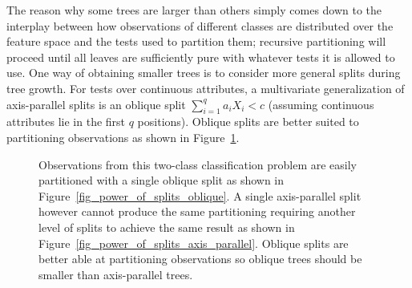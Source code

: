 The reason why some trees are larger than others simply comes down to the interplay between how observations of different classes are distributed over the feature space and the tests used to partition them; recursive partitioning will proceed until all leaves are sufficiently pure with whatever tests it is allowed to use. One way of obtaining smaller trees is to consider more general splits during tree growth. For tests over continuous attributes, a multivariate generalization of axis-parallel splits is an oblique split $\sum_{i=1}^q a_iX_i<c$ (assuming continuous attributes lie in the first $q$ positions). Oblique splits are better suited to partitioning observations as shown in Figure~\ref{fig_power_of_splits}.\\
\begin{figure}
\centering
{}
\caption{Observations from this two-class classification problem are easily partitioned with a single oblique split as shown in Figure~\ref{fig_power_of_splits_oblique}. A single axis-parallel split however cannot produce the same partitioning requiring another level of splits to achieve the same result as shown in Figure~\ref{fig_power_of_splits_axis_parallel}. Oblique splits are better able at partitioning observations so oblique trees should be smaller than axis-parallel trees.}
\label{fig_power_of_splits}
\end{figure}

